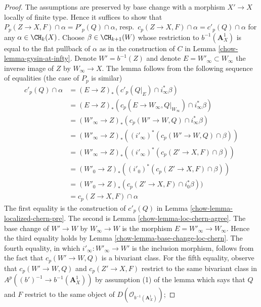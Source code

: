 \begin{proof}

The assumptions are preserved by base change with a morphism
$X' \to X$ locally of finite type. Hence it suffices to show that
$P_p(Z \to X, F) \cap \alpha = P'_p(Q) \cap \alpha$,
resp.\ $c_p(Z \to X, F) \cap \alpha = c'_p(Q) \cap \alpha$
for any $\alpha \in \CH_k(X)$. Choose $\beta \in \CH_{k + 1}(W)$
whose restriction to $b^{-1}(\mathbf{A}^1_X)$ is equal to
the flat pullback of $\alpha$ as in the construction of
$C$ in Lemma \ref{chow-lemma-gysin-at-infty}.
Denote $W' = b^{-1}(Z)$ and denote
$E = W'_\infty \subset W_\infty$ the inverse image of $Z$
by $W_\infty \to X$.
The lemma follows from
the following sequence of equalities (the case of $P_p$ is similar)
\begin{align*}
c'_p(Q) \cap \alpha
& =
(E \to Z)_*(c'_p(Q|_E) \cap i_\infty^*\beta) \\
& =
(E \to Z)_*(c_p(E \to W_\infty, Q|_{W_\infty}) \cap i_\infty^*\beta) \\
& =
(W'_\infty \to Z)_*(c_p(W' \to W, Q) \cap i_\infty^*\beta) \\
& =
(W'_\infty \to Z)_*((i'_\infty)^*(c_p(W' \to W, Q) \cap \beta)) \\
& =
(W'_\infty \to Z)_*((i'_\infty)^*(c_p(Z' \to X, F) \cap \beta)) \\
& =
(W'_0 \to Z)_*((i'_0)^*(c_p(Z' \to X, F) \cap \beta)) \\
& =
(W'_0 \to Z)_*(c_p(Z' \to X, F) \cap i_0^*\beta)) \\
& =
c_p(Z \to X, F) \cap \alpha
\end{align*}
The first equality is the construction of $c'_p(Q)$ in
Lemma \ref{chow-lemma-localized-chern-pre}.
The second is Lemma \ref{chow-lemma-loc-chern-agree}.
The base change of $W' \to W$ by $W_\infty \to W$ is the
morphism $E = W'_\infty \to W_\infty$. Hence the third equality holds
by Lemma \ref{chow-lemma-base-change-loc-chern}. The fourth
equality, in which $i'_\infty : W'_\infty \to W'$ is the
inclusion morphism, follows from the fact that $c_p(W' \to W, Q)$
is a bivariant class. For the fifth equality, observe that
$c_p(W' \to W, Q)$ and $c_p(Z' \to X, F)$
restrict to the same bivariant class in
$A^p((b')^{-1} \to b^{-1}(\mathbf{A}^1_X))$ by
assumption (1) of the lemma which says that $Q$ and $F$ restrict
to the same object of $D(\mathcal{O}_{b^{-1}(\mathbf{A}^1_X)})$;

\end{proof}
